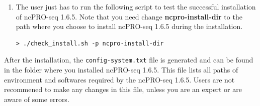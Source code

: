\documentclass[12pt]{article}
\def \ncpip{ncPRO-seq 1.6.5}
\begin{document}
\begin{enumerate}
Common users without super-user privileges can only install the command-line version of \ncpip{}, as configurations of local web server need super-user permissions. The installation command is the following:
\begin{verbatim}
> cd ncPRO-seq.v1.6.1
> make install
\end{verbatim}
For the super-user or root user, the following commands can be used to install both command-line and local web server version of \ncpip{}:
\begin{verbatim}
> cd ncPRO-seq.v1.6.1
> sudo make install
\end{verbatim}
or
\begin{verbatim}
> su
> make install
\end{verbatim}
 \item The user just has to run the following script to test the successful installation of \ncpip{}. Note that you need change \textbf{ncpro-install-dir} to the path where you choose to install \ncpip{} during the installation.

\begin{verbatim}
> ./check_install.sh -p ncpro-install-dir
\end{verbatim}
\end{enumerate}

After the installation, the \verb+config-system.txt+ file is generated and can be found in the folder where you installed \ncpip{}. This file lists all paths of environment and softwares required by the \ncpip{}. Users are not recommened to make any changes in this file, unless you are an expert or are aware of some errors.

\label{subsection:configsys}
\end{document}
